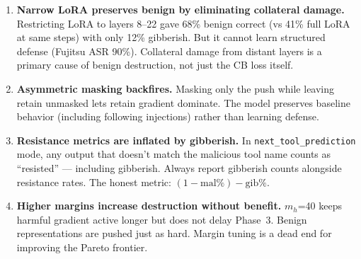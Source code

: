 \documentclass[11pt]{article}
\begin{document}
\begin{enumerate}
  \item \textbf{Narrow LoRA preserves benign by eliminating collateral
        damage.}  Restricting LoRA to layers 8--22 gave 68\% benign correct
        (vs 41\% full LoRA at same steps) with only 12\% gibberish.
        But it cannot learn structured defense (Fujitsu ASR 90\%).
        Collateral damage from distant layers is a primary cause of benign
        destruction, not just the CB loss itself.

  \item \textbf{Asymmetric masking backfires.}  Masking only the push
        while leaving retain unmasked lets retain gradient dominate.
        The model preserves baseline behavior (including following
        injections) rather than learning defense.

  \item \textbf{Resistance metrics are inflated by gibberish.}
        In \texttt{next\_tool\_prediction} mode, any output that doesn't
        match the malicious tool name counts as ``resisted'' --- including
        gibberish.  Always report gibberish counts alongside resistance
        rates.  The honest metric: $(1-\text{mal\%}) - \text{gib\%}$.

  \item \textbf{Higher margins increase destruction without benefit.}
        $m_h$=40 keeps harmful gradient active longer but does not delay
        Phase~3.  Benign representations are pushed just as hard.
        Margin tuning is a dead end for improving the Pareto frontier.
\end{enumerate}
\end{document}
